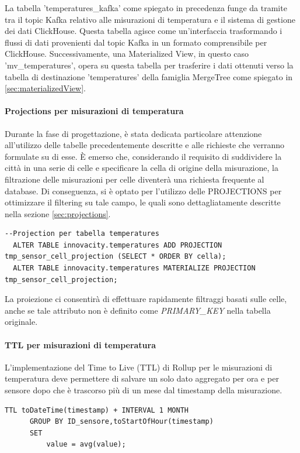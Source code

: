     La tabella 'temperatures\_kafka' come spiegato in precedenza funge da tramite tra il topic Kafka relativo alle misurazioni di temperatura e il sistema di gestione dei dati ClickHouse. Questa tabella agisce come un'interfaccia trasformando i flussi di dati provenienti dal topic Kafka in un formato comprensibile per ClickHouse. Successivamente, una Materialized View, in questo caso 'mv\_temperatures', opera su questa tabella per trasferire i dati ottenuti verso la tabella di destinazione 'temperatures' della famiglia MergeTree come spiegato in \ref{sec:materializedView}.
    
\paragraph{Projections per misurazioni di temperatura} \label{sec:temp_projections}
Durante la fase di progettazione, è stata dedicata particolare attenzione all'utilizzo delle tabelle precedentemente descritte e alle richieste che verranno formulate su di esse. È emerso che, considerando il requisito di suddividere la città in una serie di celle e specificare la cella di origine della misurazione, la filtrazione delle misurazioni per celle diventerà una richiesta frequente al database. Di conseguenza, si è optato per l'utilizzo delle PROJECTIONS per ottimizzare il filtering su tale campo, le quali sono dettagliatamente descritte nella sezione \ref{sec:projections}.
\vspace{0,3cm}
\begin{lstlisting}[caption={implementazione PROJECTION tabella temperatures}, captionpos=b]
  --Projection per tabella temperatures
  ALTER TABLE innovacity.temperatures ADD PROJECTION tmp_sensor_cell_projection (SELECT * ORDER BY cella);
  ALTER TABLE innovacity.temperatures MATERIALIZE PROJECTION tmp_sensor_cell_projection;
\end{lstlisting}
\vspace{0,3cm}
La proiezione ci consentirà di effettuare rapidamente filtraggi basati sulle celle, anche se tale attributo non è definito come \textit{PRIMARY\_KEY} nella tabella originale.
      
  \paragraph{TTL per misurazioni di temperatura} \label{sec:temp_projections}
  L'implementazione del Time to Live (TTL) di Rollup per le misurazioni di temperatura deve permettere di salvare un solo dato aggregato per ora e per sensore dopo che è trascorso più di un mese dal timestamp della misurazione.
  \begin{lstlisting}[caption={implementazione TTL tabella temperatures}, captionpos=b]
    TTL toDateTime(timestamp) + INTERVAL 1 MONTH
      GROUP BY ID_sensore,toStartOfHour(timestamp)
      SET
          value = avg(value);
  \end{lstlisting}

